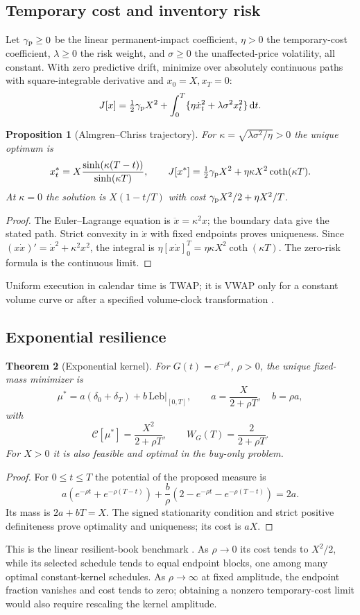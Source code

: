 \documentclass[11pt]{article}
\numberwithin{equation}{section}
\newtheorem{theorem}{Theorem}[section]
\newtheorem{proposition}[theorem]{Proposition}
\theoremstyle{definition}
\theoremstyle{remark}
\theoremstyle{definition}
\newcommand{\dd}{\,\mathrm d}
\begin{document}
\subsection{Temporary cost and inventory risk}
Let $\gamma_{\rm p}\geq0$ be the linear permanent-impact coefficient,
$\eta>0$ the temporary-cost coefficient, $\lambda\geq0$ the risk weight,
and $\sigma\geq0$ the unaffected-price volatility, all constant. With zero
predictive drift, minimize over absolutely continuous paths with square-integrable
derivative and $x_0=X,x_T=0$:
\[
 J[x]=\tfrac12\gamma_{\rm p} X^2+
       \int_0^T\{\eta\dot x_t^2+\lambda\sigma^2x_t^2\}\dd t.
\]
\begin{proposition}[Almgren--Chriss trajectory]\label{prop:acsinh}
For $\kappa=\sqrt{\lambda\sigma^2/\eta}>0$ the unique optimum is
\[
 x_t^*=X\frac{\sinh(\kappa(T-t))}{\sinh(\kappa T)},\qquad
 J[x^*]=\tfrac12\gamma_{\rm p} X^2+\eta\kappa X^2\coth(\kappa T).
\]
At $\kappa=0$ the solution is $X(1-t/T)$ with cost
$\gamma_{\rm p} X^2/2+\eta X^2/T$.
\end{proposition}
\begin{proof}
The Euler--Lagrange equation is $\ddot x=\kappa^2x$; the boundary data give the
stated path. Strict convexity in $\dot x$ with fixed endpoints proves
uniqueness. Since $(x\dot x)'=\dot x^2+\kappa^2x^2$, the integral is
$\eta[x\dot x]_0^T=\eta\kappa X^2\coth(\kappa T)$. The zero-risk formula is
the continuous limit.
\end{proof}
Uniform execution in calendar time is TWAP; it is VWAP only for a constant
volume curve or after a specified volume-clock transformation
\citep{almgren2001}.

\subsection{Exponential resilience}
\begin{theorem}[Exponential kernel]\label{thm:ow}
For $G(t)=e^{-\rho t}$, $\rho>0$, the unique fixed-mass minimizer is
\[
 \mu^*=a(\delta_0+\delta_T)+b\,\mathrm{Leb}|_{[0,T]},\qquad
 a=\frac{X}{2+\rho T},\quad b=\rho a,
\]
with
\begin{equation}\label{eq:owcost}
 \mathcal C[\mu^*]=\frac{X^2}{2+\rho T},\qquad W_G(T)=\frac2{2+\rho T}.
\end{equation}
For $X>0$ it is also feasible and optimal in the buy-only problem.
\end{theorem}
\begin{proof}
For $0\leq t\leq T$ the potential of the proposed measure is
\[
 a(e^{-\rho t}+e^{-\rho(T-t)})+
 \frac b\rho(2-e^{-\rho t}-e^{-\rho(T-t)})=2a.
\]
Its mass is $2a+bT=X$. The signed stationarity condition and strict positive
definiteness prove optimality and uniqueness; its cost is $aX$.
\end{proof}
This is the linear resilient-book benchmark \citep{obizhaevawang2013}.
As $\rho\to0$ its cost tends to $X^2/2$, while its selected schedule tends to
equal endpoint blocks, one among many optimal constant-kernel schedules.
As $\rho\to\infty$ at fixed amplitude, the endpoint fraction vanishes and
cost tends to zero; obtaining a nonzero temporary-cost limit would also require
rescaling the kernel amplitude.
\end{document}
